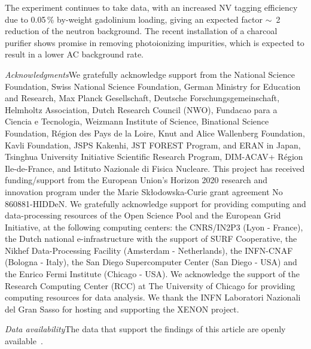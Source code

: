 \documentclass[
    reprint,
    superscriptaddress,
    aps, prl,
    amsmath,amssymb,
    twocolumn,
    showkeys,
    floatfix,
    nofootinbib,
]{revtex4-2}
\begin{document}
The experiment continues to take data, with an increased NV tagging efficiency due to 0.05\,\% by-weight gadolinium loading, giving an expected factor $\sim$~2 reduction of the neutron background.
The recent installation of a charcoal purifier shows promise in removing photoionizing impurities, which is expected to result in a lower AC background rate.

\textit{Acknowledgments\textemdash}We gratefully acknowledge support from the National Science Foundation, Swiss National Science Foundation, German Ministry for Education and Research, Max Planck Gesellschaft, Deutsche Forschungsgemeinschaft, Helmholtz Association, Dutch Research Council (NWO), Fundacao para a Ciencia e Tecnologia, Weizmann Institute of Science, Binational Science Foundation, Région des Pays de la Loire, Knut and Alice Wallenberg Foundation, Kavli Foundation, JSPS Kakenhi, JST FOREST Program, and ERAN in Japan, Tsinghua University Initiative Scientific Research Program, DIM-ACAV+ Région Ile-de-France, and Istituto Nazionale di Fisica Nucleare. This project has received funding/support from the European Union’s Horizon 2020 research and innovation program under the Marie Skłodowska-Curie grant agreement No 860881-HIDDeN.
We gratefully acknowledge support for providing computing and data-processing resources of the Open Science Pool and the European Grid Initiative, at the following computing centers: the CNRS/IN2P3 (Lyon - France), the Dutch national e-infrastructure with the support of SURF Cooperative, the Nikhef Data-Processing Facility (Amsterdam - Netherlands), the INFN-CNAF (Bologna - Italy), the San Diego Supercomputer Center (San Diego - USA) and the Enrico Fermi Institute (Chicago - USA). We acknowledge the support of the Research Computing Center (RCC) at The University of Chicago for providing computing resources for data analysis.
We thank the INFN Laboratori Nazionali del Gran Sasso for hosting and supporting the XENON project.

\textit{Data availability\textemdash}The data that support the findings of this article are openly available~\cite{data_release}.

  


\clearpage


\end{document}
